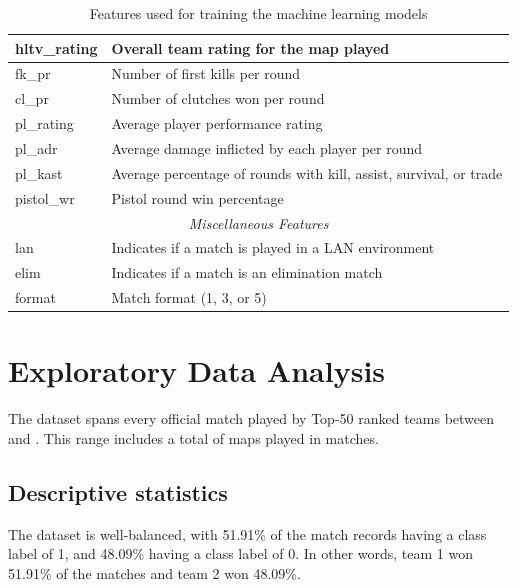 \begin{table}[h]
\begin{tabular}{|l|l|}
		hltv\_rating          & Overall team rating for the map played                                 \\ \hline
		fk\_pr 			      & Number of first kills per round                                        \\ \hline
		cl\_pr    			  & Number of clutches won per round                                       \\ \hline
		pl\_rating            & Average player performance rating                                      \\ \hline
		pl\_adr               & Average damage inflicted by each player per round                      \\ \hline
		pl\_kast              & Average percentage of rounds with kill, assist, survival, or trade     \\ \hline
		pistol\_wr 		      & Pistol round win percentage                                            \\ \hline
	\multicolumn{2}{|c|}{\rule{0pt}{2.6ex}\textit{Miscellaneous Features}} \\ \hline
		lan                   & Indicates if a match is played in a LAN environment                    \\ \hline
		elim                  & Indicates if a match is an elimination match                           \\ \hline
		format                & Match format (1, 3, or 5)                                              \\ \hline
	\end{tabular}
	\caption{Features used for training the machine learning models}
	\label{tab:features}
\end{table}

\clearpage

\section{Exploratory Data Analysis}

The dataset spans every official match played by Top-50 ranked teams between \datasetStartDate{} and \datasetEndDate{}. This range includes a total of \mapsTotal{} maps played in \matchesTotal{} matches.

\subsection{Descriptive statistics}

The dataset is well-balanced, with 51.91\% of the match records having a class label of 1, and 48.09\% having a class label of 0. In other words, team 1 won 51.91\% of the matches and team 2 won 48.09\%. 

